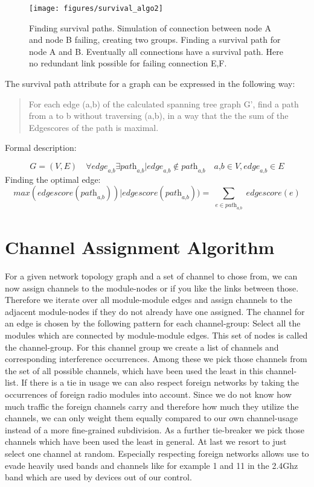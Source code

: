       \begin{figure}[h!]
	\centering
	\texttt{[image: figures/survival\_algo2]}
	\caption{Finding survival paths. Simulation of connection between node A and node B failing, creating two groups.
	  Finding a survival path for node A and B. Eventually all connections have a survival path. Here no redundant link possible for failing connection E,F.}
	\label{fig:survival_algo}
      \end{figure}
      
      The survival path attribute for a graph can be expressed in the following way:
      
      \begin{quote}
	For each edge (a,b) of the calculated spanning tree graph G', find a path from a to b without traversing (a,b), 
	in a way that the the sum of the Edgescores of the path is maximal.
      \end{quote}
      
      Formal description:
      
      $$\textit{G}=(\textit{V},\textit{E}) \quad
	\forall \textit{edge}_\textit{a,b} \exists \textit{path}_\textit{a,b} | \textit{edge}_\textit{a,b} \notin \textit{path}_\textit{a,b} \quad
	\textit{a,b} \in \textit{V}, \textit{edge}_\textit{a,b} \in \textit{E}$$
	Finding the optimal edge:
	$$\textit{max}(\textit{edgescore}(\textit{path}_\textit{a,b})) |
	\textit{edgescore}(\textit{path}_\textit{a,b})) = \sum_{\substack{e \in \textit{path}_\textit{a,b}}} \textit{edgescore}(e)$$

  \section{Channel Assignment Algorithm}
    For a given network topology graph and a set of channel to chose from, we can now assign channels to the module-nodes or if you like the links
    between those. Therefore we iterate over all module-module edges and assign channels to the adjacent module-nodes if they do not already have one assigned.
    The channel for an edge is chosen by the following pattern for each channel-group:
    Select all the modules which are connected by module-module edges. This set of nodes is called the channel-group.
    For this channel group we create a list of channels and corresponding interference occurrences.
    Among these we pick those channels from the set of all possible channels, which have been used the least in this channel-list. If there is a tie in usage
    we can also respect foreign networks by taking the occurrences of foreign radio modules into account. Since we do not know how much traffic the foreign 
    channels carry and therefore how much they utilize the channels, we can only weight them equally compared to our own channel-usage instead of a more fine-grained subdivision.
    As a further tie-breaker we pick those channels which have been used the least in general.
    At last we resort to just select one channel at random.
    Especially respecting foreign networks allows use to evade heavily used
    bands and channels like for example 1 and 11 in the 2.4Ghz band which are used by devices out of our control.
    
